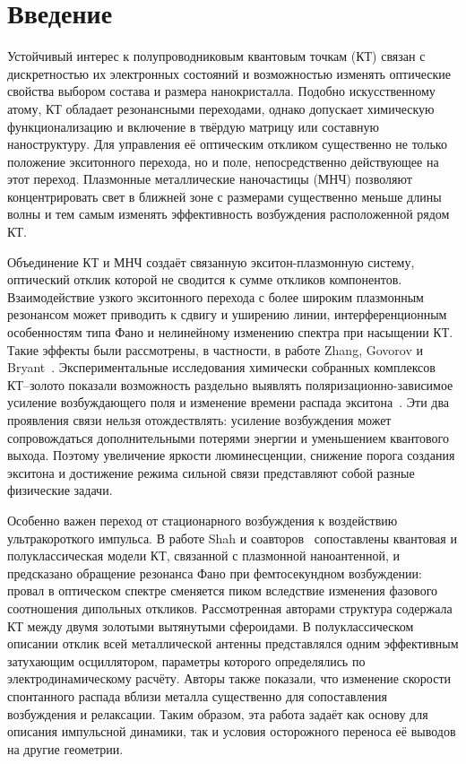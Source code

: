 \section{Введение}
\label{sec:introduction}

Устойчивый интерес к полупроводниковым квантовым точкам (КТ) связан
с дискретностью их электронных состояний и возможностью изменять
оптические свойства выбором состава и размера нанокристалла. Подобно
искусственному атому, КТ обладает резонансными переходами, однако допускает
химическую функционализацию и включение в твёрдую матрицу или составную
наноструктуру. Для управления её оптическим откликом существенно не только
положение экситонного перехода, но и поле, непосредственно действующее
на этот переход. Плазмонные металлические наночастицы (МНЧ) позволяют
концентрировать свет в ближней зоне с размерами существенно меньше длины
волны и тем самым изменять эффективность возбуждения расположенной рядом КТ.

Объединение КТ и МНЧ создаёт связанную экситон-плазмонную систему,
оптический отклик которой не сводится к сумме откликов компонентов.
Взаимодействие узкого экситонного перехода с более широким плазмонным
резонансом может приводить к сдвигу и уширению линии, интерференционным
особенностям типа Фано и нелинейному изменению спектра при насыщении КТ.
Такие эффекты были рассмотрены, в частности, в работе Zhang, Govorov
и Bryant~\cite{zhang2006}. Экспериментальные исследования химически
собранных комплексов КТ--золото показали возможность раздельно выявлять
поляризационно-зависимое усиление возбуждающего поля и изменение времени
распада экситона~\cite{cohenhoshen2012}. Эти два проявления связи нельзя
отождествлять: усиление возбуждения может сопровождаться дополнительными
потерями энергии и уменьшением квантового выхода. Поэтому увеличение
яркости люминесценции, снижение порога создания экситона и достижение режима
сильной связи представляют собой разные физические задачи.

Особенно важен переход от стационарного возбуждения к воздействию
ультракороткого импульса. В работе Shah и соавторов~\cite{shah2013}
сопоставлены квантовая и полуклассическая модели КТ, связанной с плазмонной
наноантенной, и предсказано обращение резонанса Фано при фемтосекундном
возбуждении: провал в оптическом спектре сменяется пиком вследствие изменения
фазового соотношения дипольных откликов. Рассмотренная авторами структура
содержала КТ между двумя золотыми вытянутыми сфероидами. В полуклассическом
описании отклик всей металлической антенны представлялся одним эффективным
затухающим осциллятором, параметры которого определялись по электродинамическому
расчёту. Авторы также показали, что изменение скорости спонтанного распада
вблизи металла существенно для сопоставления возбуждения и релаксации.
Таким образом, эта работа задаёт как основу для описания импульсной
динамики, так и условия осторожного переноса её выводов на другие геометрии.

